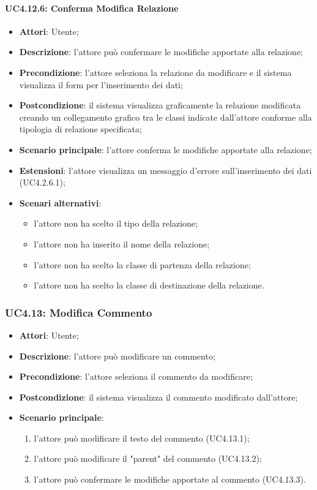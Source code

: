 \paragraph{UC4.12.6: Conferma Modifica Relazione}
\label{UC4.12.6}
\begin{itemize}
	\item \textbf{Attori}: Utente;
	\item \textbf{Descrizione}: l'attore può confermare le modifiche apportate alla relazione;
	\item \textbf{Precondizione}: l'attore seleziona la relazione da modificare e il sistema visualizza il form per l'inserimento dei dati;
	\item \textbf{Postcondizione}: il sistema visualizza graficamente la relazione modificata creando un collegamento grafico tra le classi indicate dall'attore conforme alla tipologia di relazione specificata;
	\item \textbf{Scenario principale}: l'attore conferma le modifiche apportate alla relazione;
	\item \textbf{Estensioni}: l'attore visualizza un messaggio d'errore sull'inserimento dei dati (UC4.2.6.1);
	\item \textbf{Scenari alternativi}:
	\begin{itemize}
		\item l'attore non ha scelto il tipo della relazione;
		\item l'attore non ha inserito il nome della relazione;
		\item l'attore non ha scelto la classe di partenza della relazione;
		\item l'attore non ha scelto la classe di destinazione della relazione.
	\end{itemize}
\end{itemize}

\subsubsection{UC4.13: Modifica Commento}
\label{UC4.13}
\begin{itemize}
	\item \textbf{Attori}: Utente;
	\item \textbf{Descrizione}: l'attore può modificare un commento;
	\item \textbf{Precondizione}: l'attore seleziona il commento da modificare;
	\item \textbf{Postcondizione}: il sistema visualizza il commento modificato dall'attore;
	\item \textbf{Scenario principale}:
	\begin{enumerate}
		\item l'attore può modificare il testo del commento (UC4.13.1);
		\item l'attore può modificare il "parent" del commento (UC4.13.2);
		\item l'attore può confermare le modifiche apportate al commento (UC4.13.3).
	\end{enumerate}
\end{itemize}

